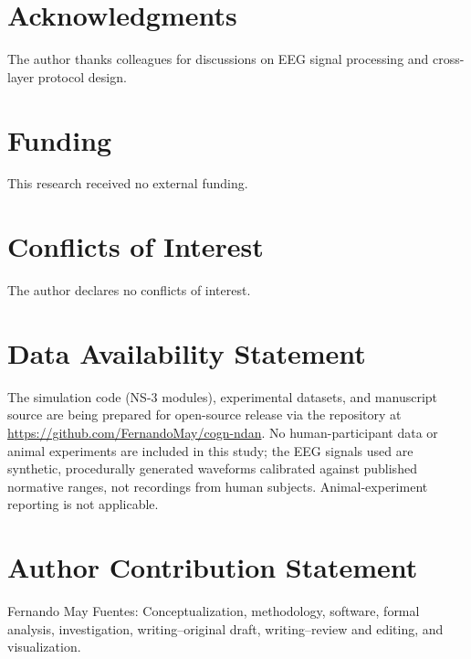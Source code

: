 \documentclass{BVP_CINC}
\begin{document}
\section*{Acknowledgments}
The author thanks colleagues for discussions on EEG signal processing and cross-layer protocol design.

\section*{Funding}
This research received no external funding.

\section*{Conflicts of Interest}
The author declares no conflicts of interest.

\section*{Data Availability Statement}
The simulation code (NS-3 modules), experimental datasets, and manuscript source are being prepared for open-source release via the repository at \url{https://github.com/FernandoMay/cogn-ndan}. No human-participant data or animal experiments are included in this study; the EEG signals used are synthetic, procedurally generated waveforms calibrated against published normative ranges, not recordings from human subjects. Animal-experiment reporting is not applicable.

\section*{Author Contribution Statement}
Fernando May Fuentes: Conceptualization, methodology, software, formal analysis, investigation, writing--original draft, writing--review and editing, and visualization.
\end{document}
